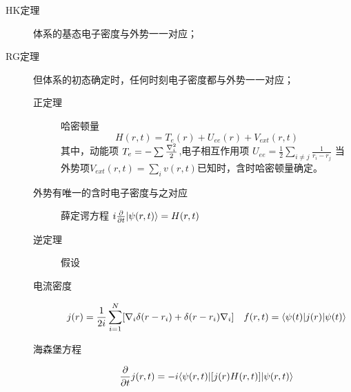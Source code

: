 \begin{description}
	\item[HK定理] 体系的基态电子密度与外势一一对应；
	\item[RG定理] 但体系的初态确定时，任何时刻电子密度都与外势一一对应；
	\begin{description}
	\item[正定理] 哈密顿量
	\begin{equation}
	H(r,t)=T_{e}(r)+U_{ee}(r)+V_{ext}(r,t)
	\end{equation} 
	其中，动能项 $T_e=-\sum\frac{\nabla^2_i}{2}$,电子相互作用项 $U_{ee}=\frac{1}{2}\sum_{i\neq j}\frac{1}{r_i-r_j}$
	当外势项$V_{ext}(r,t)=\sum_iv(r,t)$已知时，含时哈密顿量确定。
	
	\item[外势有唯一的含时电子密度与之对应]
	薛定谔方程 $i\frac{\partial}{\partial t}| \psi(r,t) \rangle=H(r,t)$

	\item[逆定理] 假设

	\item[电流密度] 
	\begin{equation}
	j(r)=\frac{1}{2i}\sum_{i=1}^{N}[\nabla_i\delta(r-r_i)+\delta(r-r_i)\nabla_i]\quad f(r,t)=\langle \psi(t) | j(r) | \psi(t) \rangle\end{equation}


	 \item[海森堡方程]
	 \begin{equation}
	 \frac{\partial}{\partial t}j(r,t)=-i\langle \psi(r,t) | [j(r)H(r,t)] | \psi(r,t) \rangle
	 \end{equation}


	\end{description}


\end{description}
